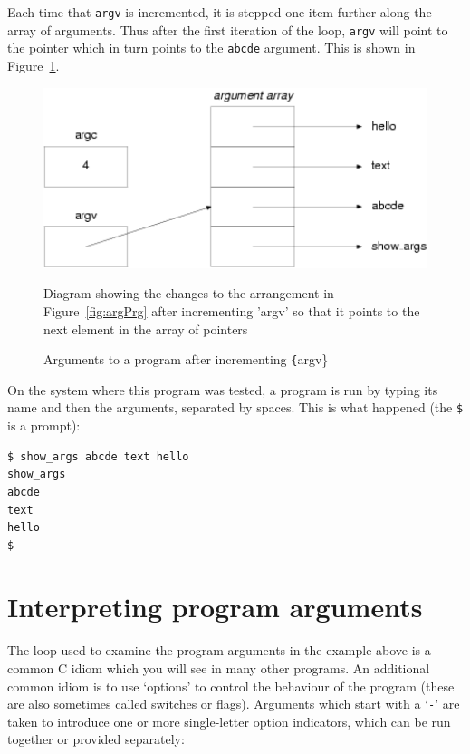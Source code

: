   
  Each time that \texttt{argv} is incremented, it is stepped one item
   further along the array of arguments. Thus after the first iteration of
   the loop, \texttt{argv} will point to the pointer which in turn
   points to the \texttt{abcde} argument.  This is shown in
   Figure~\ref{fig:argPrgInc}.


   \begin{figure}\centering
     \includegraphics[type=pdf,read=.pdf,ext=.pdf,scale=0.9]
     {figure/10.2_argPrgInc}
     \caption*{Diagram showing the changes
       to the arrangement in Figure~\ref{fig:argPrg}
       after incrementing 'argv' so that it points to the next
       element in the array of pointers}
     \caption{\label{fig:argPrgInc}Arguments to a program after incrementing
       \texttt\{argv\}}
   \end{figure}


  On the system where this program was tested, a program is run by typing
   its name and then the arguments, separated by spaces. This is what
   happened (the \texttt{\$} is a prompt):


  \begin{Verbatim}
$ show_args abcde text hello
show_args
abcde
text
hello
$
\end{Verbatim}

 
        \section{Interpreting program arguments}
        

  

  The loop used to examine the program arguments in the example above is
   a common C idiom which you will see in many other programs. An additional
   common idiom is to use `options' to control the behaviour of the
   program (these are also sometimes called switches or flags). Arguments which
   start with a `\texttt{-}' are taken to introduce one or more
   single-letter option indicators, which can be run together or provided
   separately:


